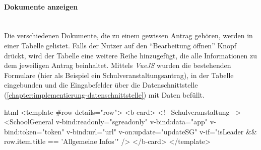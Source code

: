 \paragraph{Dokumente anzeigen}
~\\
Die verschiedenen Dokumente, die zu einem gewissen Antrag gehören, werden in einer Tabelle gelistet. Falls der Nutzer auf den \enquote{Bearbeitung öffnen} Knopf drückt, wird der Tabelle eine weitere Reihe hinzugefügt, die alle Informationen zu dem jeweiligen Antrag beinhaltet. Mittels \textit{VueJS} wurden die bestehenden Formulare (hier als Beispiel ein Schulveranstaltungsantrag), in der Tabelle eingebunden und die Eingabefelder über die Datenschnittstelle (\autoref{chapter:implementierung-datenschnittstelle}) mit Daten befüllt.
\begin{code}{html}
	<template #row-details="row">
        <b-card>
            <!-- Schulveranstaltung -->
            <SchoolGeneral
            v-bind:readonly="sgreadonly"
            v-bind:data="app"
            v-bind:token="token"
            v-bind:url="url"
            v-on:update="updateSG"
            v-if="isLeader && row.item.title == 'Allgemeine Infos'"
            />
		</b-card>
	</template>
\end{code}
	\label{list:docanz} ~\\

